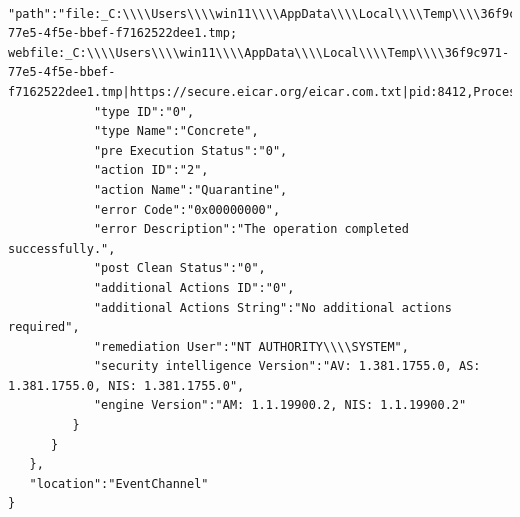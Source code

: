 \begin{itemize}
\begin{verbatim}
            "path":"file:_C:\\\\Users\\\\win11\\\\AppData\\\\Local\\\\Temp\\\\36f9c971-77e5-4f5e-bbef-f7162522dee1.tmp; webfile:_C:\\\\Users\\\\win11\\\\AppData\\\\Local\\\\Temp\\\\36f9c971-77e5-4f5e-bbef-f7162522dee1.tmp|https://secure.eicar.org/eicar.com.txt|pid:8412,ProcessStart:133173854939240064",
            "type ID":"0",
            "type Name":"Concrete",
            "pre Execution Status":"0",
            "action ID":"2",
            "action Name":"Quarantine",
            "error Code":"0x00000000",
            "error Description":"The operation completed successfully.",
            "post Clean Status":"0",
            "additional Actions ID":"0",
            "additional Actions String":"No additional actions required",
            "remediation User":"NT AUTHORITY\\\\SYSTEM",
            "security intelligence Version":"AV: 1.381.1755.0, AS: 1.381.1755.0, NIS: 1.381.1755.0",
            "engine Version":"AM: 1.1.19900.2, NIS: 1.1.19900.2"
         }
      }
   },
   "location":"EventChannel"
}
    \end{verbatim}


\end{itemize}
